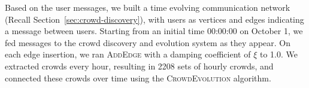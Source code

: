 \documentclass{sig-alternate}
\begin{document}




Based on the user messages, we built a time evolving communication network
(Recall Section~\ref{sec:crowd-discovery}), with users as vertices and edges
indicating a message between users. Starting from an initial time 00:00:00 on
October 1, we fed messages to the crowd discovery and evolution system as they appear. On each edge
insertion, we ran {\scshape AddEdge} with a damping
coefficient of $\xi$ to 1.0. We extracted crowds every hour,  resulting in 2208 sets of hourly crowds, and connected these
crowds over time using the {\scshape CrowdEvolution} algorithm.




\end{document}
